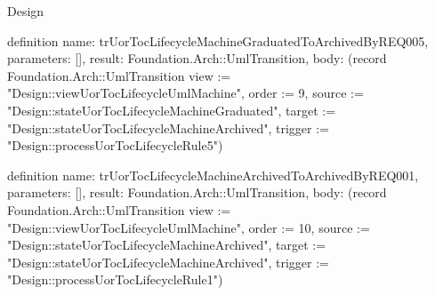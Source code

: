 \begin{lexlean}{Design}
\begin{semanticmodule}
definition{
  name: trUorTocLifecycleMachineGraduatedToArchivedByREQ005,
  parameters: [],
  result: Foundation.Arch::UmlTransition,
  body: (record Foundation.Arch::UmlTransition {view := "Design::viewUorTocLifecycleUmlMachine", order := 9, source := "Design::stateUorTocLifecycleMachineGraduated", target := "Design::stateUorTocLifecycleMachineArchived", trigger := "Design::processUorTocLifecycleRule5"})
}

definition{
  name: trUorTocLifecycleMachineArchivedToArchivedByREQ001,
  parameters: [],
  result: Foundation.Arch::UmlTransition,
  body: (record Foundation.Arch::UmlTransition {view := "Design::viewUorTocLifecycleUmlMachine", order := 10, source := "Design::stateUorTocLifecycleMachineArchived", target := "Design::stateUorTocLifecycleMachineArchived", trigger := "Design::processUorTocLifecycleRule1"})
}
\end{semanticmodule}
\end{lexlean}
